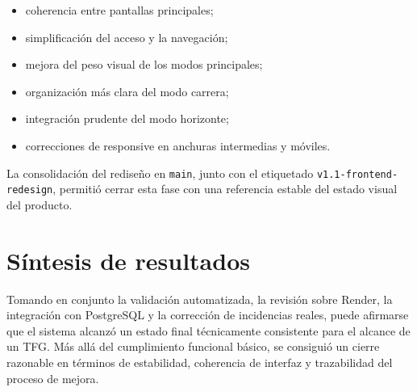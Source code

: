 \begin{itemize}
    \item coherencia entre pantallas principales;
    \item simplificación del acceso y la navegación;
    \item mejora del peso visual de los modos principales;
    \item organización más clara del modo carrera;
    \item integración prudente del modo horizonte;
    \item correcciones de responsive en anchuras intermedias y móviles.
\end{itemize}

La consolidación del rediseño en \texttt{main}, junto con el etiquetado \texttt{v1.1-frontend-redesign}, permitió cerrar esta fase con una referencia estable del estado visual del producto.

\section{Síntesis de resultados}

Tomando en conjunto la validación automatizada, la revisión sobre Render, la integración con PostgreSQL y la corrección de incidencias reales, puede afirmarse que el sistema alcanzó un estado final técnicamente consistente para el alcance de un TFG. Más allá del cumplimiento funcional básico, se consiguió un cierre razonable en términos de estabilidad, coherencia de interfaz y trazabilidad del proceso de mejora.
